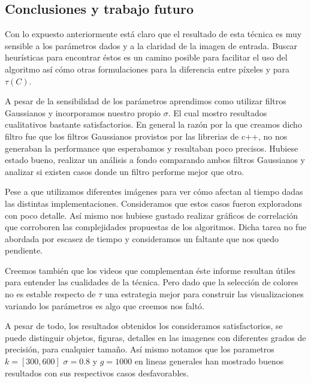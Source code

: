 \subsection{Conclusiones y trabajo futuro}

Con lo expuesto anteriormente está claro que el resultado de esta técnica es
muy sensible a los parámetros dados y a la claridad de la imagen de entrada.
Buscar heurísticas para encontrar éstos es un camino posible para facilitar el
uso del algoritmo así cómo otras formulaciones para la diferencia entre píxeles
y para $\tau(C)$.

A pesar de la sensibilidad de los parámetros aprendimos como utilizar filtros Gaussianos y incorporamos nuestro propio $\sigma$. El cual mostro resultados cualitativos bastante satisfactorios. En general la razón por la que creamos dicho filtro fue que los filtros Gaussianos provistos por las librerias de c++, no nos generaban la performance que esperabamos y resultaban poco precisos. Hubiese estado bueno, realizar un análisis a fondo comparando ambos filtros Gaussianos y analizar si existen casos donde un filtro performe mejor que otro. 

Pese a que utilizamos diferentes imágenes para ver cómo afectan al tiempo dadas las distintas implementaciones. Consideramos que estos casos fueron exploradons con poco detalle. Así mismo nos hubiese gustado realizar gráficos de correlación que corroboren las complejidades propuestas de los algoritmos. Dicha tarea no fue abordada por escasez de tiempo y consideramos un faltante que nos quedo pendiente.

Creemos también que los videos que complementan éste informe resultan útiles para entender las cualidades de la técnica. Pero dado que la selección de colores no es estable respecto de $\tau$ una estrategia
mejor para construir las visualizaciones variando los parámetros es algo que creemos nos faltó.

A pesar de todo, los resultados obtenidos los consideramos satisfactorios, se puede distinguir objetos, figuras, detalles en las imagenes con diferentes grados de precisión, para cualquier tamaño. Así mismo notamos que los parametros $k=[300,600]$ $\sigma = 0.8$ y $g = 1000$ en lineas generales han mostrado buenos resultados con sus respectivos casos desfavorables. 
